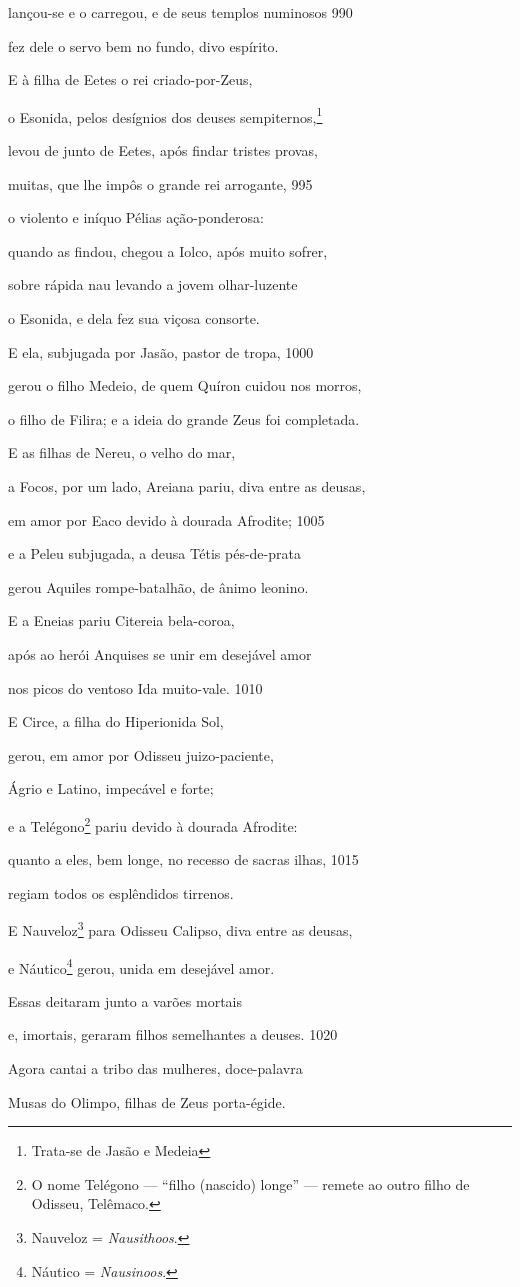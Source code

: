 lançou-se e o carregou, e de seus templos numinosos \num{990}

fez dele o servo bem no fundo, divo espírito.

\quad{}E à filha de Eetes o rei criado-por-Zeus,

o Esonida, pelos desígnios dos deuses sempiternos,\footnote{Trata-se de Jasão e Medeia}

levou de junto de Eetes, após findar tristes provas,

muitas, que lhe impôs o grande rei arrogante, \num{995}

o violento e iníquo Pélias ação-ponderosa:

quando as findou, chegou a Iolco, após muito sofrer,

sobre rápida nau levando a jovem olhar-luzente

o Esonida, e dela fez sua viçosa consorte.

E ela, subjugada por Jasão, pastor de tropa, \num{1000}

gerou o filho Medeio, de quem Quíron cuidou nos morros,

o filho de Filira; e a ideia do grande Zeus foi completada.

\quad{}E as filhas de Nereu, o velho do mar,

a Focos, por um lado, Areiana pariu, diva entre as deusas,

em amor por Eaco devido à dourada Afrodite; \num{1005}

e a Peleu subjugada, a deusa Tétis pés-de-prata

gerou Aquiles rompe-batalhão, de ânimo leonino.

\quad{}E a Eneias pariu Citereia bela-coroa,

após ao herói Anquises se unir em desejável amor

nos picos do ventoso Ida muito-vale. \num{1010}

\quad{}E Circe, a filha do Hiperionida Sol,

gerou, em amor por Odisseu juizo-paciente,

Ágrio e Latino, impecável e forte;

e a Telégono\footnote{O nome Telégono --- ``filho (nascido) longe'' --- remete ao outro filho de Odisseu, Telêmaco.} pariu devido à dourada Afrodite:

quanto a eles, bem longe, no recesso de sacras ilhas, \num{1015}

regiam todos os esplêndidos tirrenos.

\quad{}E Nauveloz\footnote{Nauveloz = \emph{Nausithoos}.} para Odisseu Calipso, diva entre as deusas,

e Náutico\footnote{Náutico = \emph{Nausinoos}.} gerou, unida em desejável amor.

\quad{}Essas deitaram junto a varões mortais

e, imortais, geraram filhos semelhantes a deuses. \num{1020}

Agora cantai a tribo das mulheres, doce-palavra

Musas do Olimpo, filhas de Zeus porta-égide.

\endgroup